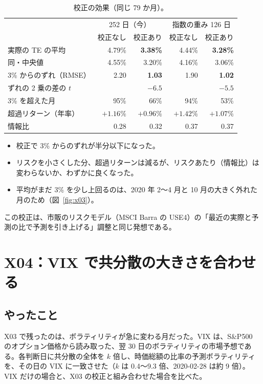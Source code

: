 \documentclass[xelatex,ja=standard,jafont=haranoaji,a4paper,10pt,openany]{bxjsreport}
\newcommand{\SP}{S\&P500}
\newcommand{\figref}[1]{図~\ref{#1}}
\begin{document}
\begin{table}[H]
\centering
\caption{校正の効果（同じ 79 か月）。}
\small
\begin{tabular}{lrrrr}
\toprule
& \multicolumn{2}{c}{252 日（今）} & \multicolumn{2}{c}{指数の重み 126 日} \\
& 校正なし & 校正あり & 校正なし & 校正あり \\
\midrule
実際の TE の平均 & 4.79\% & \textbf{3.38\%} & 4.44\% & \textbf{3.28\%} \\
同・中央値 & 4.55\% & 3.20\% & 4.16\% & 3.06\% \\
3\% からのずれ（RMSE） & 2.20 & \textbf{1.03} & 1.90 & \textbf{1.02} \\
ずれの 2 乗の差の $t$ & & $-6.5$ & & $-5.5$ \\
3\% を超えた月 & 95\% & 66\% & 94\% & 53\% \\
超過リターン（年率） & $+1.16\%$ & $+0.96\%$ & $+1.42\%$ & $+1.07\%$ \\
情報比 & 0.28 & 0.32 & 0.37 & 0.37 \\
\bottomrule
\end{tabular}
\end{table}

\begin{itemize}
\item 校正で 3\% からのずれが半分以下になった。
\item リスクを小さくした分、超過リターンは減るが、リスクあたり（情報比）は変わらないか、わずかに良くなった。
\item 平均がまだ 3\% を少し上回るのは、2020 年 2〜4 月と 10 月の大きく外れた月のため（\figref{fig:x03}）。
\end{itemize}

この校正は、市販のリスクモデル（MSCI Barra の USE4）の「最近の実際と予測の比で予測を引き上げる」調整と同じ発想である。

\chapter{X04：VIX で共分散の大きさを合わせる}\label{ch:x04}

\section{やったこと}

X03 で残ったのは、ボラティリティが急に変わる月だった。VIX は、\SP{} のオプション価格から読み取った、翌 30 日のボラティリティの市場予想である。各判断日に共分散の全体を $k$ 倍し、時価総額の比率の予測ボラティリティを、その日の VIX に一致させた（$k$ は 0.4〜9.3 倍、2020-02-28 は約 9 倍）。VIX だけの場合と、X03 の校正と組み合わせた場合を比べた。
\end{document}

